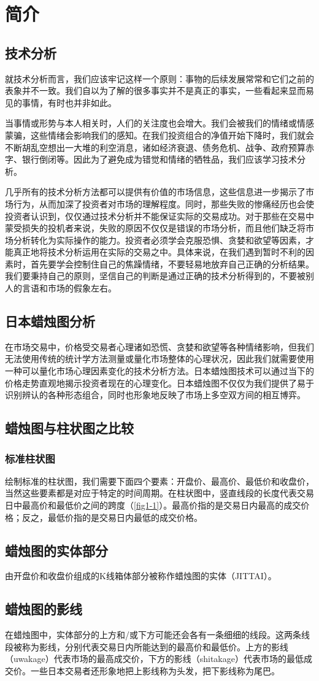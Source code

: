 \chapter{简介}
\section{技术分析}
就技术分析而言，我们应该牢记这样一个原则：事物的后续发展常常和它们之前的表象并不一致。我们自以为了解的很多事实并不是真正的事实，一些看起来显而易见的事情，有时也并非如此。

当事情或形势与本人相关时，人们的关注度也会增大。我们会被我们的情绪或情感蒙骗，这些情绪会影响我们的感知。在我们投资组合的净值开始下降时，我们就会不断胡乱空想出一大堆的利空消息，诸如经济衰退、债务危机、战争、政府预算赤字、银行倒闭等。因此为了避免成为错觉和情绪的牺牲品，我们应该学习技术分析。

几乎所有的技术分析方法都可以提供有价值的市场信息，这些信息进一步揭示了市场行为，从而加深了投资者对市场的理解程度。同时，那些失败的惨痛经历也会使投资者认识到，仅仅通过技术分析并不能保证实际的交易成功。对于那些在交易中蒙受损失的投机者来说，失败的原因不仅仅是错误的市场分析，而且他们缺乏将市场分析转化为实际操作的能力。投资者必须学会克服恐惧、贪婪和欲望等因素，才能真正地将技术分析运用在实际的交易之中。具体来说，在我们遇到暂时不利的因素时，首先要学会控制住自己的焦躁情绪，不要轻易地放弃自己正确的分析结果。我们要秉持自己的原则，坚信自己的判断是通过正确的技术分析得到的，不要被别人的言语和市场的假象左右。
\section{日本蜡烛图分析}
在市场交易中，价格受交易者心理诸如恐慌、贪婪和欲望等各种情绪影响，但我们无法使用传统的统计学方法测量或量化市场整体的心理状况，因此我们就需要使用一种可以量化市场心理因素变化的技术分析方法。日本蜡烛图技术可以通过当下的价格走势直观地揭示投资者现在的心理变化。日本蜡烛图不仅仅为我们提供了易于识别辨认的各种形态组合，同时也形象地反映了市场上多空双方间的相互博弈。
\section{蜡烛图与柱状图之比较}
\subsection*{标准柱状图}
绘制标准的柱状图，我们需要下面四个要素：开盘价、最高价、最低价和收盘价，当然这些要素都是对应于特定的时间周期。在柱状图中，竖直线段的长度代表交易日中最高价和最低价之间的跨度（\autoref{fig1-1}）。最高价指的是交易日内最高的成交价格；反之，最低价指的是交易日内最低的成交价格。
\section{蜡烛图的实体部分}
由开盘价和收盘价组成的K线箱体部分被称作蜡烛图的实体（JITTAI）。
\section{蜡烛图的影线}
在蜡烛图中，实体部分的上方和/或下方可能还会各有一条细细的线段。这两条线段被称为影线，分别代表交易日内所能达到的最高价和最低价。上方的影线（uwakage）代表市场的最高成交价，下方的影线（shitakage）代表市场的最低成交价。一些日本交易者还形象地把上影线称为头发，把下影线称为尾巴。